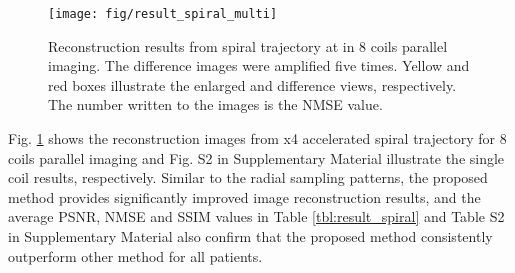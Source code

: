 \documentclass[10pt,journal]{IEEEtran}
\newcommand{\0}{{\boldsymbol{0}}}
\begin{document}
\begin{figure}[!t] 	
\centerline{\texttt{[image: fig/result\_spiral\_multi]}}
\caption{Reconstruction results from spiral trajectory at  in 8 coils parallel imaging. The difference images were amplified five times. Yellow and red boxes illustrate the enlarged and difference views, respectively. The number written to the images is the NMSE value.}
\label{fig:result_spiral}
\end{figure}


\begin{table}[!t]
\centerline{
}
\vspace*{0.1cm}
\caption{Quantitative comparison from radial undersampling at  in 8 coils parallel imaging. }



\label{tbl:result_radial}
\end{table}



 Fig. \ref{fig:result_spiral} shows the reconstruction images from x4 accelerated  spiral trajectory for 8 coils parallel imaging and Fig. S2 in Supplementary Material illustrate the single coil results, respectively.
Similar to the radial sampling patterns, the proposed method provides significantly improved image reconstruction results, and the average PSNR, NMSE and SSIM values in Table \ref{tbl:result_spiral} and Table S2 in Supplementary Material also confirm that the proposed method consistently outperform other method for all patients. 
\end{document}
